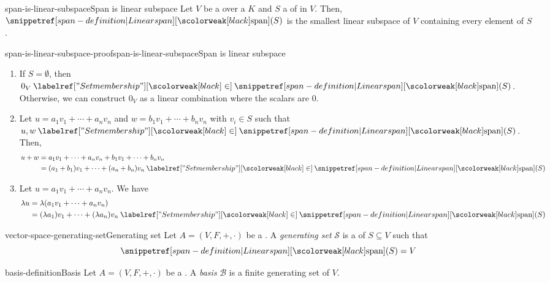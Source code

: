 \documentclass[preview]{standalone}
\begin{document}

\begin{snippetproposition}{span-is-linear-subspace}{Span is linear subspace}
    Let \(V\) be a \vectorspace over a \field \(K\) and \(S\) a \set of \vector[vectors] in \(V\).
    Then, \(\linearspan(S)\) is the smallest linear subspace of \(V\) containing
    every element of \(S\).
\end{snippetproposition}

\begin{snippetproof}{span-is-linear-subspace-proof}{span-is-linear-subspace}{Span is linear subspace}
    \begin{enumerate}
        \item If \(S = \emptyset\), then \(0_V \in \linearspan(S)\). Otherwise,
        we can construct \(0_V\) as a linear combination where the scalars are \(0\).
        \item Let \(u = a_1v_1 + \cdots + a_nv_n\) and \(w = b_1v_1 + \cdots + b_nv_n\)
        with \(v_i \in S\) such that \(u, w \in \linearspan(S)\). Then,
        \begin{align*}
            u+w &= a_1v_1 + \cdots + a_nv_n + b_1v_1 + \cdots + b_nv_n \\
            &= (a_1 + b_1)v_1 + \cdots + (a_n + b_n)v_n \in \linearspan(S)
        \end{align*}
        \item Let \(u = a_1v_1 + \cdots + a_nv_n\). We have
        \begin{align*}
            \lambda u &= \lambda(a_1v_1 + \cdots + a_nv_n) \\
            &= (\lambda a_1)v_1 + \cdots + (\lambda a_n)v_n \in \linearspan(S)
        \end{align*}
    \end{enumerate}
\end{snippetproof}



\begin{snippetdefinition}{vector-space-generating-set}{Generating set}
    Let \(A=(V, F, +, \cdot)\) be a \vectorspace.
    A \textit{generating set} \(\mathcal{S}\) is a
    \set of \vector[vectors] \(S\subseteq V\) such that \[ \linearspan(S) = V \]
\end{snippetdefinition}

\begin{snippetdefinition}{basis-definition}{Basis}
    Let \(A=(V, F, +, \cdot)\) be a \vectorspace.
    A \textit{basis} \(\mathcal{B}\) is a finite \linearlyindependent
    generating set of \(V\).
\end{snippetdefinition}
\end{document}
